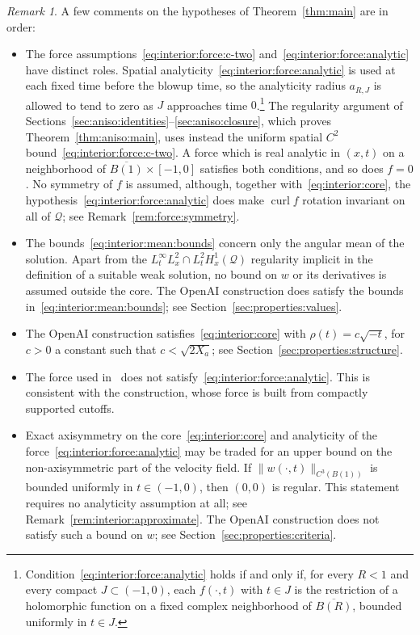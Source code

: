 \documentclass[11pt,reqno]{amsproc}
\numberwithin{equation}{section}
\theoremstyle{remark}
\newtheorem{remark}[theorem]{Remark}
\newcommand{\curl}{\operatorname{curl}}
\begin{document}
\begin{remark}
\label{rem:main:comments}
A few comments on the hypotheses of Theorem~\ref{thm:main} are in order:
\begin{itemize}[leftmargin=2em]
\item[(a)] The force assumptions~\eqref{eq:interior:force:c-two} and~\eqref{eq:interior:force:analytic} have distinct roles. Spatial analyticity~\eqref{eq:interior:force:analytic} is used at each fixed time before the blowup time, so the analyticity radius $a_{R,J}$ is allowed to tend to zero as $J$ approaches time $0$.\footnote{Condition~\eqref{eq:interior:force:analytic} holds if and only if, for every $R<1$ and every compact $J\subset(-1,0)$, each $f(\cdot,t)$ with $t\in J$ is the restriction of a holomorphic function on a fixed complex neighborhood of $\overline{B(R)}$, bounded uniformly in $t\in J$.} The regularity argument of Sections~\ref{sec:aniso:identities}--\ref{sec:aniso:closure}, which proves Theorem~\ref{thm:aniso:main}, uses instead the uniform spatial $C^2$ bound~\eqref{eq:interior:force:c-two}. A force which is real analytic in $(x,t)$ on a neighborhood of $\overline{B(1)}\times[-1,0]$ satisfies both conditions, and so does $f=0$. No symmetry of $f$ is assumed, although, together with~\eqref{eq:interior:core}, the hypothesis~\eqref{eq:interior:force:analytic} does make $\curl f$ rotation invariant on all of $\mathcal Q$; see Remark~\ref{rem:force:symmetry}.
\item[(b)] The bounds~\eqref{eq:interior:mean:bounds} concern only the angular mean of the solution. Apart from the $L^\infty_tL^2_x\cap L^2_tH^1_x(\mathcal Q)$ regularity implicit in the definition of a suitable weak solution, no bound on $w$ or its derivatives is assumed outside the core. The OpenAI construction does satisfy the bounds in~\eqref{eq:interior:mean:bounds}; see Section~\ref{sec:properties:values}.
\item[(c)] The OpenAI construction satisfies~\eqref{eq:interior:core} with $\rho(t)=c\sqrt{-t}$, for $c>0$ a constant such that $c<\sqrt{2X_a}$; see Section~\ref{sec:properties:structure}.
\item[(d)] The force used in~\cite{OpenAIManuscript} does not satisfy~\eqref{eq:interior:force:analytic}. This is consistent with the construction, whose force is built from compactly supported cutoffs.
\item[(e)] Exact axisymmetry on the core~\eqref{eq:interior:core} and analyticity of the force~\eqref{eq:interior:force:analytic} may be traded for an upper bound on the non-axisymmetric part of the velocity field. If $\|w(\cdot,t)\|_{C^3(B(1))}$ is bounded uniformly in $t\in (-1,0)$, then $(0,0)$ is regular. This statement requires no analyticity assumption at all; see Remark~\ref{rem:interior:approximate}. The OpenAI construction does not satisfy such a bound on $w$; see Section~\ref{sec:properties:criteria}.
\end{itemize}
\end{remark}
\end{document}
